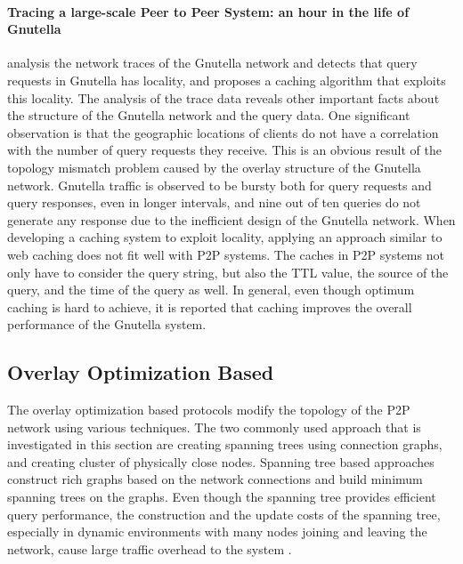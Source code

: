 \documentclass[acmcsur]{acmtrans2m}
\begin{document}
\paragraph*{\bf Tracing a large-scale Peer to Peer System: an hour in the life of
Gnutella}

\cite{Markatos02} analysis the network traces of the Gnutella network and
detects that query requests in Gnutella has locality, and proposes a caching
algorithm that exploits this locality. The analysis of the trace data reveals
other important facts about the structure of the Gnutella network and the query
data.  One significant observation is that the geographic locations of clients
do not have a correlation with the number of query requests they receive. This
is an obvious result of the topology mismatch problem caused by the overlay
structure of the Gnutella network. Gnutella traffic is observed to be bursty
both for query requests and query responses, even in longer intervals, and nine
out of ten queries do not generate any response due to the inefficient design of
the Gnutella network. When developing a caching system to exploit locality,
applying an approach similar to web caching does not fit well with P2P systems.
The caches in P2P systems not only have to consider the query string, but also
the TTL value, the source of the query, and the time of the query as well.  In
general, even though optimum caching is hard to achieve, it is reported that
caching improves the overall performance of the Gnutella system.

\subsection{Overlay Optimization Based}

The overlay optimization based protocols modify the topology of the P2P network
using various techniques. The two commonly used approach that is investigated in
this section are creating spanning trees using 
connection graphs, and creating cluster of physically close nodes. 
Spanning tree based approaches construct rich graphs based on the network
connections and build minimum spanning trees on the graphs. Even though the
spanning tree provides efficient query performance, the construction
and the update costs of the spanning tree, especially in dynamic environments
with many nodes joining and leaving the network, cause large traffic
overhead to the system \cite{chu_esm_2000,chu_esm_2002}.
\end{document}
